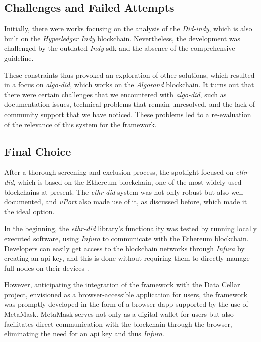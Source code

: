 \subsection{Challenges and Failed Attempts}

Initially, there were works focusing on the analysis of the \textit{Did-indy}, which is also built on the \textit{Hyperledger Indy} blockchain. Nevertheless, the development was challenged 
by the outdated \textit{Indy} \gls{sdk} and the absence of the comprehensive guideline. 

These constraints thus provoked an exploration of other solutions, which resulted in a focus on \textit{algo-did}, which works on the \textit{Algorand} blockchain. It turns out that 
there were certain challenges that we encountered with \textit{algo-did}, such as documentation issues, technical problems that remain unresolved, and the lack of community 
support that we have noticed. These problems led to a re-evaluation of the relevance of this system for the framework.

\subsection{Final Choice}

After a thorough screening and exclusion process, the spotlight focused on \textit{ethr-did}, which is based on the Ethereum blockchain, one of the most widely used blockchains at 
present. The \textit{ethr-did} system was not only robust but also well-documented, and \textit{uPort} also made use of it, as discussed before, which made it the ideal option. 

In the beginning, the \textit{ethr-did} library's functionality was tested by running locally executed software, using \textit{Infura} to communicate with the Ethereum blockchain. 
Developers can easily get access to the blockchain networks through \textit{Infura} by creating an \gls{api} key, and this is done without requiring them to directly manage 
full nodes on their devices \cite{infura}.

However, anticipating the integration of the framework with the Data Cellar project, envisioned as a browser-accessible application for users, the framework was promptly developed 
in the form of a browser \gls{dapp} supported by the use of MetaMask. MetaMask serves not only as a digital wallet for users but also facilitates direct communication with the 
blockchain through the browser, eliminating the need for an \gls{api} key and thus \textit{Infura}.

